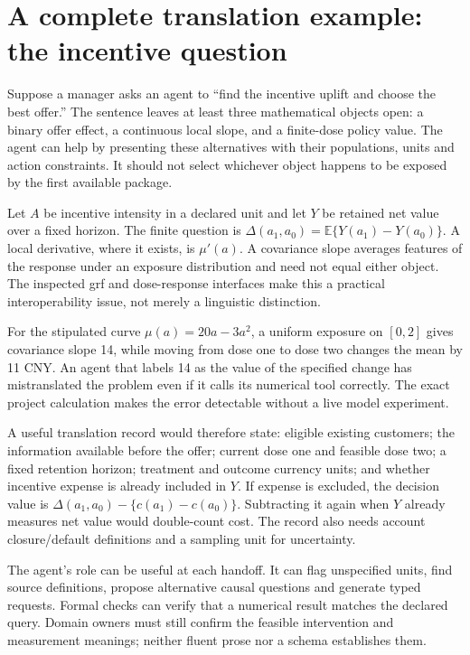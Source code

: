 \section{A complete translation example: the incentive question}
\label{v13:la-dose}

Suppose a manager asks an agent to ``find the incentive uplift and choose the
best offer.'' The sentence leaves at least three mathematical objects open:
a binary offer effect, a continuous local slope, and a finite-dose policy value.
The agent can help by presenting these alternatives with their populations,
units and action constraints. It should not select whichever object happens
to be exposed by the first available package.

Let $A$ be incentive intensity in a declared unit and let $Y$ be retained net
value over a fixed horizon. The finite question is
$\Delta(a_1,a_0)=\mathbb E\{Y(a_1)-Y(a_0)\}$. A local derivative, where it
exists, is $\mu'(a)$. A covariance slope averages features of the response
under an exposure distribution and need not equal either object. The inspected
grf and dose-response interfaces make this a practical interoperability issue,
not merely a linguistic distinction. \cite{v13_sw_grf,v13_sw_causaldrf}

For the stipulated curve $\mu(a)=20a-3a^2$, a uniform exposure on $[0,2]$
gives covariance slope 14, while moving from dose one to dose two changes the
mean by 11 CNY. An agent that labels 14 as the value of the specified change
has mistranslated the problem even if it calls its numerical tool correctly.
The exact project calculation makes the error detectable without a live model
experiment. \cite{v13_project_exact}

A useful translation record would therefore state: eligible existing customers;
the information available before the offer; current dose one and feasible dose
two; a fixed retention horizon; treatment and outcome currency units; and
whether incentive expense is already included in $Y$. If expense is excluded,
the decision value is $\Delta(a_1,a_0)-\{c(a_1)-c(a_0)\}$. Subtracting it again
when $Y$ already measures net value would double-count cost. The record also
needs account closure/default definitions and a sampling unit for uncertainty.

The agent's role can be useful at each handoff. It can flag unspecified units,
find source definitions, propose alternative causal questions and generate
typed requests. Formal checks can verify that a numerical result matches the
declared query. Domain owners must still confirm the feasible intervention and
measurement meanings; neither fluent prose nor a schema establishes them.

